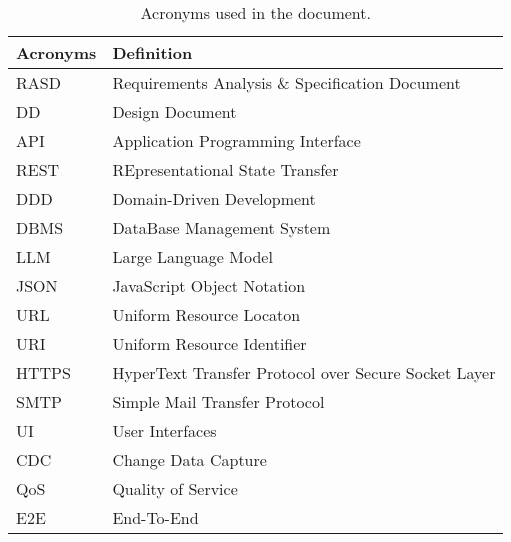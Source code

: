 \begin{table}[H]
    \begin{center}
        \begin{tabular}{ |l|l| }
            \hline
            \textbf{Acronyms} & \textbf{Definition}                              \\
            \hline
            RASD           & Requirements Analysis \& Specification Document   \\
            \hline
            DD             & Design Document   \\
            \hline
            API            & Application Programming Interface                  \\
            \hline
            REST           & REpresentational State Transfer   \\
            \hline
            DDD            & Domain-Driven Development   \\
            \hline
            DBMS           & DataBase Management System   \\
            \hline
            LLM            & Large Language Model  \\
            \hline 
            JSON           & JavaScript Object Notation  \\
            \hline
            URL            & Uniform Resource Locaton  \\
            \hline
            URI            & Uniform Resource Identifier  \\
            \hline
            HTTPS          & HyperText Transfer Protocol over Secure Socket Layer   \\
            \hline
            SMTP           & Simple Mail Transfer Protocol  \\
            \hline
            UI             & User Interfaces \\
            \hline
            CDC            & Change Data Capture \\
            \hline
            QoS             & Quality of Service \\
            \hline            
            E2E            & End-To-End \\
            \hline
         \end{tabular}
        \caption{Acronyms used in the document.}
        \label{tab:acronyms}%
    \end{center}
\end{table}


